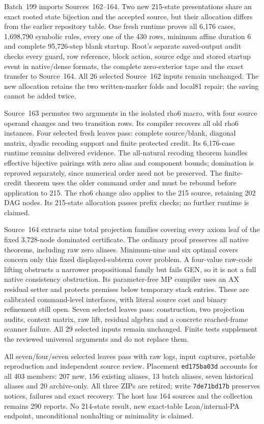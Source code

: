 \documentclass[11pt]{article}
\begin{document}
{Batch~199 imports Sources~162--164. Two new 215-state presentations
share an exact rooted state bijection and the accepted source, but their
allocation differs from the earlier repository table. One fresh runtime
proves all 6,176 cases, 1,698,790 symbolic rules, every one of the 430 rows,
minimum affine duration 6 and complete 95,726-step blank startup. Root's
separate saved-output audit checks every guard, row reference, block action,
source edge and stored startup event in native/dense formats, the complete
zero-exterior tape and the exact transfer to Source~164. All 26 selected
Source~162 inputs remain unchanged. The new allocation retains the two
written-marker folds and local81 repair; the saving cannot be added twice.

Source~163 permutes two arguments in the isolated rho6 macro, with four
source operand changes and two transition rows. Its compiler recovers all
old rho6 instances. Four selected fresh leaves pass: complete source/blank,
diagonal matrix, dyadic recoding support and finite protected credit. Its
6,176-case runtime remains delivered evidence. The all-natural recoding
theorem handles effective bijective pairings with zero alias and component
bounds; domination is reproved separately, since numerical order need not
be preserved. The finite-credit theorem uses the older command order and
must be rebound before application to 215. The rho6 change also applies to
the 215 source, retaining 202 DAG nodes. Its 215-state allocation passes
prefix checks; no further runtime is claimed.

Source~164 extracts nine total projection families covering every axiom
leaf of the fixed 3,728-node dominated certificate. The ordinary proof
preserves all native theorems, including raw zero aliases. Minimum-nine
and six optimal covers concern only this fixed displayed-subterm cover
problem. A four-value raw-code lifting obstructs a narrower propositional
family but fails GEN, so it is not a full native consistency obstruction.
Its parameter-free MP compiler uses an AX residual setter and protects
premises below temporary stack entries. These are calibrated command-level
interfaces, with literal source cost and binary refinement still open.
Seven selected leaves pass: construction, two projection audits, context
matrix, raw lift, residual algebra and a concrete reached-frame scanner
failure. All 29 selected inputs remain unchanged. Finite tests supplement
the reviewed universal arguments and do not replace them.

All seven/four/seven selected leaves pass with raw logs, input captures,
portable reproduction and independent source review. Placement
\texttt{ed175ba03d} accounts for all 403 members: 207 new, 156 existing
aliases, 13 batch aliases, seven historical aliases and 20 archive-only.
All three ZIPs are retired; write \texttt{7de71bd17b} preserves notices,
failures and exact recovery. The host has 164 sources and the collection
remains 290 reports. No 214-state result, new exact-table Lean/internal-PA
endpoint, unconditional nonhalting or minimality is claimed.


}
\end{document}
